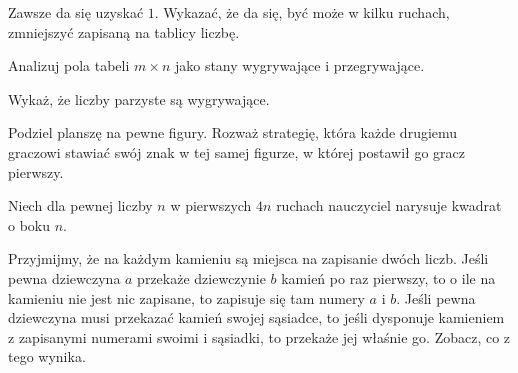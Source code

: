 
\begin{hints_list}
	\item Zawsze da się uzyskać $1$. Wykazać, że da się, być może w kilku ruchach, zmniejszyć zapisaną na tablicy liczbę.
	\item Analizuj pola tabeli $m \times n$ jako stany wygrywające i przegrywające.
	\item Wykaż, że liczby parzyste są wygrywające.
	\item Podziel planszę na pewne figury. Rozważ strategię, która każde drugiemu graczowi stawiać swój znak w tej samej figurze, w której postawił go gracz pierwszy.
	\item Niech dla pewnej liczby $n$ w pierwszych $4n$ ruchach nauczyciel narysuje kwadrat o boku $n$.
	\item Przyjmijmy, że na każdym kamieniu są miejsca na zapisanie dwóch liczb. Jeśli pewna dziewczyna $a$ przekaże dziewczynie $b$ kamień po raz pierwszy, to o ile na kamieniu nie jest nic zapisane, to zapisuje się tam numery $a$ i $b$.  Jeśli pewna dziewczyna musi przekazać kamień swojej sąsiadce, to jeśli dysponuje kamieniem z zapisanymi numerami swoimi i sąsiadki, to przekaże jej właśnie go. Zobacz, co z tego wynika.
\end{hints_list}